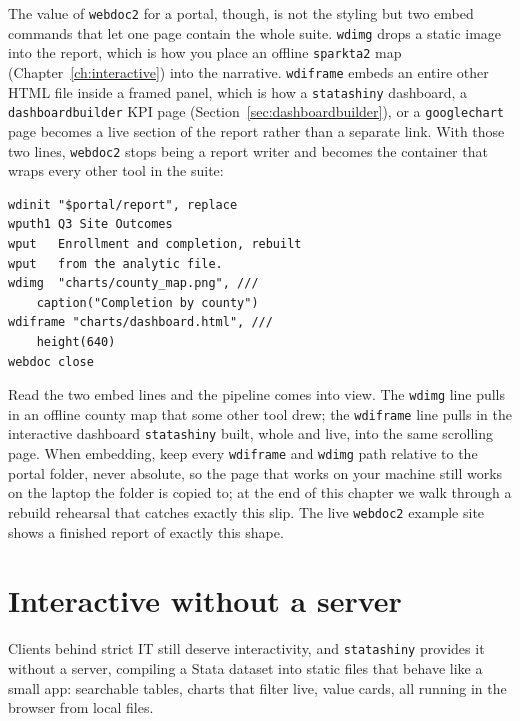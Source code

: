 \documentclass[
    a4paper,
    fontsize=10pt,
    twoside=true,
    numbers=noenddot,
]{kaobook}
\begin{document}
The value of \texttt{webdoc2} for a portal, though, is not the styling but two embed commands that let one page contain the whole suite. \texttt{wdimg} drops a static image into the report, which is how you place an offline \texttt{sparkta2} map (Chapter~\ref{ch:interactive}) into the narrative. \texttt{wdiframe} embeds an entire other HTML file inside a framed panel, which is how a \texttt{statashiny} dashboard, a \texttt{dashboardbuilder} KPI page (Section~\ref{sec:dashboardbuilder}), or a \texttt{googlechart} page becomes a live section of the report rather than a separate link. With those two lines, \texttt{webdoc2} stops being a report writer and becomes the container that wraps every other tool in the suite:
\par
{\footnotesize
\begin{verbatim}
wdinit "$portal/report", replace
wputh1 Q3 Site Outcomes
wput   Enrollment and completion, rebuilt
wput   from the analytic file.
wdimg  "charts/county_map.png", ///
    caption("Completion by county")
wdiframe "charts/dashboard.html", ///
    height(640)
webdoc close
\end{verbatim}
}
Read the two embed lines and the pipeline comes into view. The \texttt{wdimg} line pulls in an offline county map that some other tool drew; the \texttt{wdiframe} line pulls in the interactive dashboard \texttt{statashiny} built, whole and live, into the same scrolling page. When embedding, keep every \texttt{wdiframe} and \texttt{wdimg} path relative to the portal folder, never absolute, so the page that works on your machine still works on the laptop the folder is copied to; at the end of this chapter we walk through a rebuild rehearsal that catches exactly this slip. The live \texttt{webdoc2} example site shows a finished report of exactly this shape.

\section{Interactive without a server}
Clients behind strict IT still deserve interactivity, and \texttt{statashiny} provides it without a server, compiling a Stata dataset into static files that behave like a small app: searchable tables, charts that filter live, value cards, all running in the browser from local files.
\end{document}
